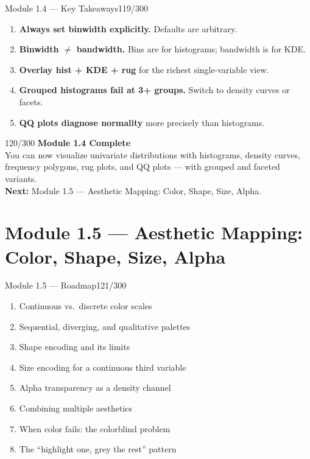 \documentclass[10pt]{beamer}
\newcommand{\smark}[1]{\hfill{\scriptsize\color{codegray}#1}}
\begin{document}
\begin{frame}{Module 1.4 --- Key Takeaways}\smark{119/300}
\begin{enumerate}
    \item \textbf{Always set binwidth explicitly.} Defaults are arbitrary.
    \item \textbf{Binwidth $\neq$ bandwidth.} Bins are for histograms; bandwidth is for KDE.
    \item \textbf{Overlay hist + KDE + rug} for the richest single-variable view.
    \item \textbf{Grouped histograms fail at 3+ groups.} Switch to density curves or facets.
    \item \textbf{QQ plots diagnose normality} more precisely than histograms.
\end{enumerate}
\end{frame}

\begin{frame}{}\smark{120/300}
\centering\vspace{1.5cm}
{\Large\textbf{Module 1.4 Complete}}\\[0.5cm]
You can now visualize univariate distributions with histograms, density curves, frequency polygons, rug plots, and QQ plots --- with grouped and faceted variants.\\[0.5cm]
\textbf{Next:} Module 1.5 --- Aesthetic Mapping: Color, Shape, Size, Alpha.
\end{frame}

\section{Module 1.5 --- Aesthetic Mapping: Color, Shape, Size, Alpha}

\begin{frame}{Module 1.5 --- Roadmap}\smark{121/300}
\begin{enumerate}
    \item Continuous vs.\ discrete color scales
    \item Sequential, diverging, and qualitative palettes
    \item Shape encoding and its limits
    \item Size encoding for a continuous third variable
    \item Alpha transparency as a density channel
    \item Combining multiple aesthetics
    \item When color fails: the colorblind problem
    \item The ``highlight one, grey the rest'' pattern
\end{enumerate}
\end{frame}
\end{document}
